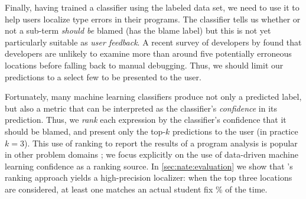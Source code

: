 


Finally, having trained a classifier
using the labeled data set, we need to use
it to help users localize type errors in
their programs.
%
The classifier tells us whether or not
a sub-term \emph{should be}
blamed (\ie has the blame label) but this
is not yet particularly suitable as
\emph{user feedback}.
%
A recent survey of developers by
\citet{Kochhar2016-oc} found that
developers are unlikely to examine
more than around five potentially
erroneous locations before falling
back to manual debugging.
%
Thus, we should limit our predictions
to a select few to be presented to
the user.

%
Fortunately, many machine learning
classifiers produce not only a predicted
label, but also a metric that can be
interpreted as the classifier's
\emph{confidence} in its prediction.
%
Thus, we \emph{rank} each expression
by the classifier's confidence that
it should be blamed, and present only
the top-$k$ predictions to the
user (in practice $k=3$).
%
This use of ranking to report the
results of a program analysis is
popular in other problem domains
\citep[see, \eg][]{Kremenek2003-ck};
we focus explicitly on the use of
data-driven machine learning
confidence as a ranking source.
%
In \autoref{sec:nate:evaluation} we show
that \toolname's ranking approach
yields a high-precision localizer:
when the top three locations are considered,
at least one matches an actual student fix
\HiddenFhTopThree\% of the time.




